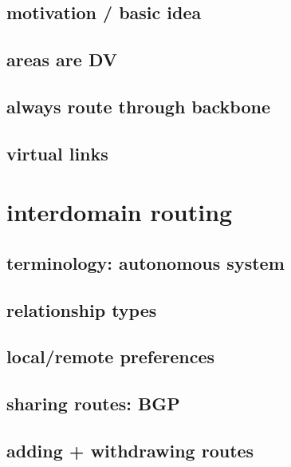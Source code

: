 \subsection{motivation / basic idea}



\subsection{areas are DV}



\subsection{always route through backbone}


\subsection{virtual links}


\section{interdomain routing}


\subsection{terminology: autonomous system}


\subsection{relationship types}


\subsection{local/remote preferences}


\subsection{sharing routes: BGP}


\subsection{adding + withdrawing routes}

